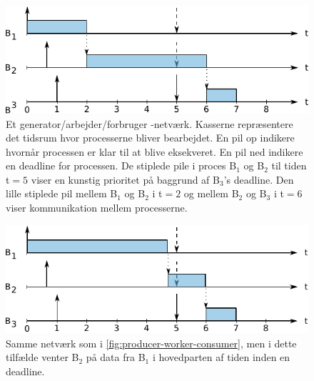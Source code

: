 \begin{figure}
 \begin{center}
  \includegraphics[scale=1.00]{images/producer-worker-consumer}
  \caption{Et generator/arbejder/forbruger -netværk. Kasserne repræsentere det tidsrum hvor processerne bliver bearbejdet. En pil op indikere hvornår processen er klar til at blive eksekveret. En pil ned indikere en deadline for processen. De stiplede pile i proces B$_1$ og B$_2$ til tiden t$=5$ viser en kunstig prioritet på baggrund af B$_3$'s deadline. Den lille stiplede pil mellem  B$_1$ og B$_2$ i t$=2$ og mellem B$_2$ og B$_3$ i t$=6$ viser kommunikation mellem processerne.}
  \label{fig:producer-worker-consumer}
  \end{center}
\end{figure}
\begin{figure}
 \begin{center}
  \includegraphics[scale=1.00]{images/producer-worker-consumer2}
  \caption{Samme netværk som i \autoref{fig:producer-worker-consumer}, men i dette tilfælde venter B$_2$  på data fra B$_1$ i hovedparten af tiden inden en deadline.}
  \label{fig:producer-worker-consumer2}
  \end{center}
\end{figure}


